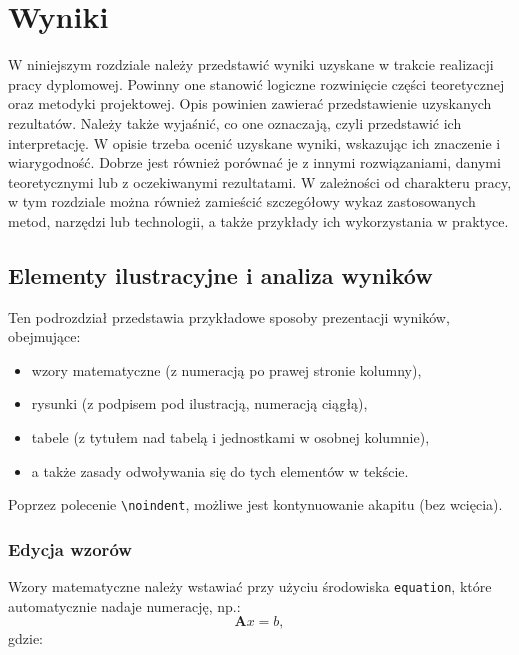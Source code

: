\chapter{Wyniki}\label{chapter:3_Results}
W niniejszym rozdziale należy przedstawić wyniki uzyskane w trakcie realizacji pracy dyplomowej. Powinny one stanowić logiczne rozwinięcie części teoretycznej oraz metodyki projektowej. Opis powinien zawierać przedstawienie uzyskanych rezultatów. Należy także wyjaśnić, co one oznaczają, czyli przedstawić ich interpretację. W opisie trzeba ocenić uzyskane wyniki, wskazując ich znaczenie i wiarygodność. Dobrze jest również porównać je z innymi rozwiązaniami, danymi teoretycznymi lub z oczekiwanymi rezultatami. W zależności od charakteru pracy, w tym rozdziale można również zamieścić szczegółowy wykaz zastosowanych metod, narzędzi lub technologii, a także przykłady ich wykorzystania w praktyce.

\section{Elementy ilustracyjne  i analiza wyników}
\noindent Ten podrozdział przedstawia przykładowe sposoby prezentacji wyników, obejmujące:
\begin{itemize}
  \item wzory matematyczne (z numeracją po prawej stronie kolumny),
  \item rysunki (z podpisem pod ilustracją, numeracją ciągłą),
  \item tabele (z tytułem nad tabelą i jednostkami w osobnej kolumnie),
  \item a także zasady odwoływania się do tych elementów w tekście.
\end{itemize}

\noindent Poprzez polecenie \verb|\noindent|, możliwe jest kontynuowanie akapitu (bez wcięcia).

\subsection{Edycja wzorów}
Wzory matematyczne należy wstawiać przy użyciu środowiska  \verb|equation|, które automatycznie nadaje numerację, np.:
\begin{equation}
\label{eq:linear_equation}
\mathbf{A}x=b,
\end{equation}
\noindent gdzie:

